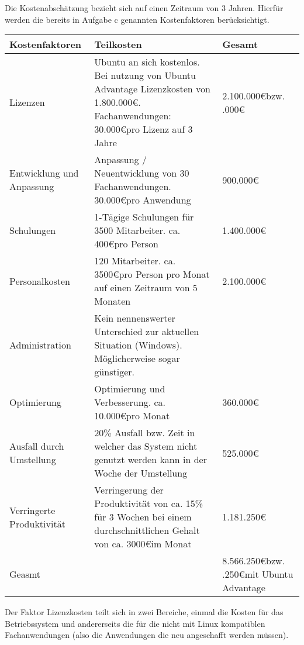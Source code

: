 \documentclass[12pt,utf8]{scrartcl}
\begin{document}
Die Kostenabschätzung bezieht sich auf einen Zeitraum von 3 Jahren. Hierfür werden die bereits in Aufgabe c genannten Kostenfaktoren berücksichtigt.

\begin{table}[h]
\begin{tabular}{|p{5cm}|p{8cm}|p{2cm}|}
\hline
Kostenfaktoren & Teilkosten & Gesamt \\
\hline
Lizenzen & Ubuntu an sich kostenlos. Bei nutzung von Ubuntu Advantage Lizenzkosten von 1.800.000\euro . \newline 70 Fachanwendungen: 30.000\euro \space pro Lizenz auf 3 Jahre & 2.100.000\euro \newline bzw. \newline 3.900.000\euro \\
\hline
Entwicklung und Anpassung & Anpassung / Neuentwicklung von 30 Fachanwendungen. 30.000\euro \space pro Anwendung & 900.000\euro \\
\hline
Schulungen & 1-Tägige Schulungen für 3500 Mitarbeiter. ca. 400\euro \space pro Person & 1.400.000\euro \\
\hline
Personalkosten & 120 Mitarbeiter. ca. 3500\euro \space pro Person pro Monat auf einen Zeitraum von 5 Monaten & 2.100.000\euro \\
\hline
Administration & Kein nennenswerter Unterschied zur aktuellen Situation (Windows). Möglicherweise sogar günstiger. & \\
\hline
Optimierung & Optimierung und Verbesserung. ca. 10.000\euro pro Monat & 360.000\euro \\
\hline
Ausfall durch Umstellung & 20\% Ausfall bzw. Zeit in welcher das System nicht genutzt werden kann in der Woche der Umstellung & 525.000\euro \\
\hline
Verringerte Produktivität & Verringerung der Produktivität von ca. 15\% für 3 Wochen bei einem durchschnittlichen Gehalt von ca. 3000\euro \space im Monat & 1.181.250\euro \\
\hline
Geasmt & & 8.566.250\euro \newline bzw. \newline 10.366.250\euro \space mit Ubuntu Advantage \\
\hline
\end{tabular}
\end{table}

Der Faktor Lizenzkosten teilt sich in zwei Bereiche, einmal die Kosten für das Betriebssystem und andererseits die für die nicht mit Linux kompatiblen Fachanwendungen (also die Anwendungen die neu angeschafft werden müssen). 
\end{document}
